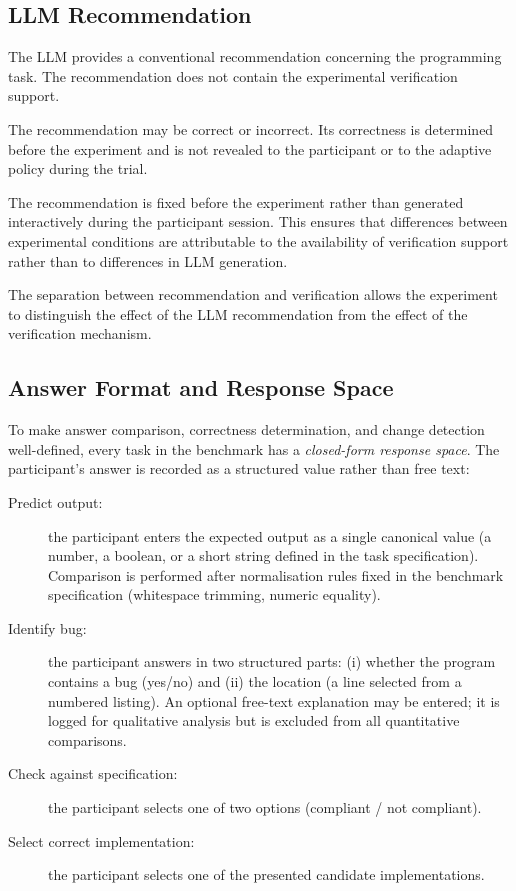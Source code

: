\documentclass[oneside,final,14pt,a4paper]{extreport}
\theoremstyle{definition}
\theoremstyle{remark}
\begin{document}
\subsection{LLM Recommendation}
The LLM provides a conventional recommendation concerning the programming task.
The recommendation does not contain the experimental verification support.

The recommendation may be correct or incorrect. Its correctness is determined
before the experiment and is not revealed to the participant or to the adaptive
policy during the trial.

The recommendation is fixed before the experiment rather than generated
interactively during the participant session. This ensures that differences
between experimental conditions are attributable to the availability of
verification support rather than to differences in LLM generation.

The separation between recommendation and verification allows the experiment to
distinguish the effect of the LLM recommendation from the effect of the
verification mechanism.

\subsection{Answer Format and Response Space}
\label{subsec:answerspace}
To make answer comparison, correctness determination, and change detection
well-defined, every task in the benchmark has a \emph{closed-form response
space}. The participant's answer is recorded as a structured value rather
than free text:
\begin{description}
    \item[Predict output:] the participant enters the expected output as a
    single canonical value (a number, a boolean, or a short string defined in
    the task specification). Comparison is performed after normalisation
    rules fixed in the benchmark specification (whitespace trimming, numeric
    equality).
    \item[Identify bug:] the participant answers in two structured parts:
    (i) whether the program contains a bug (yes/no) and (ii) the location
    (a line selected from a numbered listing). An optional free-text
    explanation may be entered; it is logged for qualitative analysis but is
    excluded from all quantitative comparisons.
    \item[Check against specification:] the participant selects one of two
    options (compliant / not compliant).
    \item[Select correct implementation:] the participant selects one of the
    presented candidate implementations.
\end{description}
\end{document}

